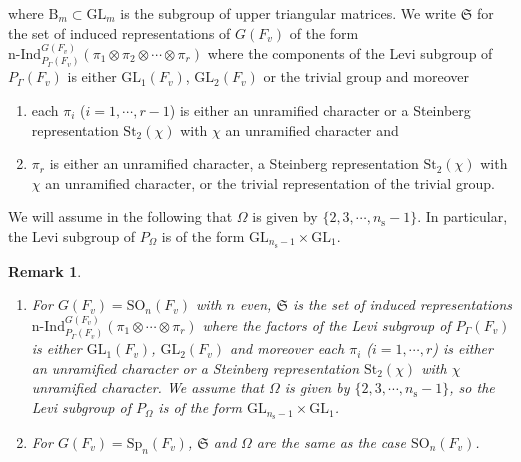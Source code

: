 \documentclass[12pt,oneside,reqno]{amsart}
\theoremstyle{plain}
\newtheorem{remark}[theorem]{Remark}
\begin{document}
	where
	$\mathrm{B}_m\subset\mathrm{GL}_m$
	is the subgroup of upper triangular matrices.
	We write
	$\mathfrak{S}$
	for the set of induced representations
	of
	$ G(F_v)$
	of the form
	$\mathrm{n}\text{-}
	\mathrm{Ind}_{P_\Gamma(F_v)}^{ G(F_v)}
	(\pi_1\otimes\pi_2\otimes\cdots\otimes\pi_r)$
	where the components of
	the Levi subgroup of $P_\Gamma(F_v)$
	is either $\mathrm{GL}_1(F_v)$,
	$\mathrm{GL}_2(F_v)$
	or
	the trivial group
	and moreover
	\begin{enumerate}
		\item
		each $\pi_i$
		($i=1,\cdots,r-1$)
		is either an unramified character
		or a Steinberg representation
		$\mathrm{St}_2(\chi)$
		with $\chi$ an unramified character and
		
		
		\item 
		$\pi_r$
		is either an unramified character,
		a Steinberg representation
		$\mathrm{St}_2(\chi)$
		with $\chi$ an unramified character, or the trivial representation of the trivial group.
	\end{enumerate}
	
	
	
	
	
	
	We will assume in the following that $\Omega$ is given by $\{2,3,\cdots,n_{\mathrm{s}}-1\}$. In particular, the Levi subgroup of $P_\Omega$ is of the form $\mathrm{GL}_{n_{\mathrm{s}}-1}\times\mathrm{GL}_1$.
	\begin{remark}\rm
		\begin{enumerate}
			\item
			For $G(F_v)=\mathrm{SO}_n(F_v)$ with $n$ even,
			$\mathfrak{S}$ is the set of induced representations
			$\mathrm{n}\text{-}\mathrm{Ind}_{P_\Gamma(F_v)}^{ G(F_v)}
			(\pi_1\otimes\cdots\otimes\pi_r)$ where the factors of the Levi subgroup of
			$P_\Gamma(F_v)$	is either $\mathrm{GL}_1(F_v)$,	$\mathrm{GL}_2(F_v)$
			and moreover each $\pi_i$ ($i=1,\cdots,r$) is either an unramified character or a Steinberg representation $\mathrm{St}_2(\chi)$ with $\chi$
			unramified character. We assume that $\Omega$ is given by $\{2,3,\cdots,n_{\mathrm{s}}-1\}$, so the Levi subgroup of $P_\Omega$ is of the form	$\mathrm{GL}_{n_{\mathrm{s}}-1}\times\mathrm{GL}_1$.
			
			
			\item 
			For $G(F_v)=\mathrm{Sp}_n(F_v)$, $\mathfrak{S}$ and $\Omega$ are the same as the case $\mathrm{SO}_n(F_v)$.
		\end{enumerate}
	\end{remark}
	
\end{document}
